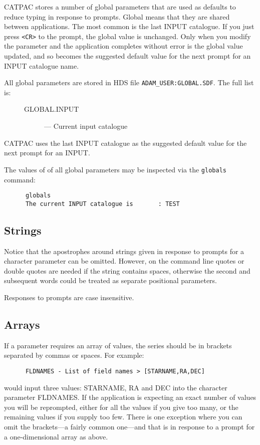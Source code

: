 {\small CATPAC} stores a number of global parameters that are used as defaults
to reduce typing in response to prompts. Global means that they are shared
between applications.  The most common is the last INPUT catalogue. If you just
press {\tt <CR>} to the prompt, the global value is unchanged. Only when you
modify the parameter and the  application completes without error is the global
value updated, and so becomes the suggested default value for the next prompt
for an INPUT catalogue name.

All global parameters are stored in HDS file {\tt ADAM\_USER:GLOBAL.SDF}.
The full list is:

\begin{description}
\item[\mbox{}]\mbox{}
\begin{description}
\item [GLOBAL.INPUT] --- Current input catalogue
\end{description}
\end{description}

{\small CATPAC} uses the last INPUT catalogue as the
suggested default value for the next prompt for an INPUT.

The values of of all global parameters may be inspected via the
{\tt globals} command:
\begin{verbatim}
      globals
      The current INPUT catalogue is       : TEST
\end{verbatim}

\subsection{Strings}
\label{se:parstring}
Notice that the apostrophes around strings given in response to prompts
for a character parameter can be omitted. However, on the command
line quotes or double quotes are needed if the string contains spaces,
otherwise the second and subsequent words could be treated as
separate positional parameters.

Responses to prompts are case insensitive.

\subsection{Arrays}
If a parameter requires an array of values, the series
should be in brackets separated by commas or spaces.  For example:
\begin{verbatim}
      FLDNAMES - List of field names > [STARNAME,RA,DEC]
\end{verbatim}
would input three values: STARNAME, RA and DEC into the character parameter
FLDNAMES.  If the application is expecting an exact number of values
you will be reprompted, either for all the values if you give too many,
or the remaining values if you supply too few.  There is one exception
where you can omit the brackets---a fairly common one---and that is in
response to a prompt for a one-dimensional array as above.

